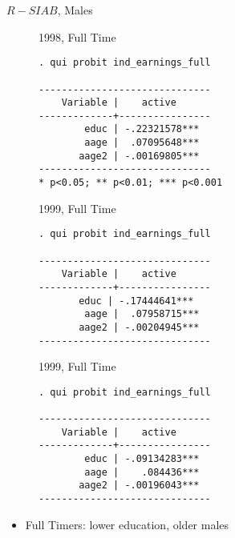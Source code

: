 \documentclass{beamer}
\begin{document}
\begin{frame}[fragile]{$R-SIAB$, Males}
\begin{figure}
\centering
\begin{minipage}[b]{0.3\textwidth}{1998, Full Time}
\begin{Verbatim}[fontsize=\tiny]
. qui probit ind_earnings_full

------------------------------
    Variable |    active      
-------------+----------------
        educ | -.22321578***  
        aage |  .07095648***  
       aage2 | -.00169805***  
------------------------------
* p<0.05; ** p<0.01; *** p<0.001
\end{Verbatim}
\end{minipage}
\begin{minipage}[b]{0.3\textwidth}{1999, Full Time}
\begin{Verbatim}[fontsize=\tiny]
. qui probit ind_earnings_full

------------------------------
    Variable |    active      
-------------+----------------
       educ | -.17444641***  
        aage |  .07958715***  
       aage2 | -.00204945***   
------------------------------
\end{Verbatim}
\end{minipage}
\begin{minipage}[b]{0.3\textwidth}{1999, Full Time}
\begin{Verbatim}[fontsize=\tiny]
. qui probit ind_earnings_full

------------------------------
    Variable |    active      
-------------+----------------
        educ | -.09134283***  
        aage |    .084436***  
       aage2 | -.00196043***    
------------------------------
\end{Verbatim}
\end{minipage}
\end{figure}
\begin{itemize}
\item Full Timers: lower education, older males 
\end{itemize}
\end{frame}
\end{document}
